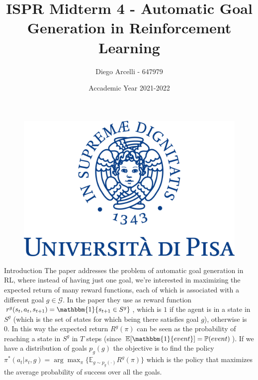 \documentclass{beamer}
\author[Diego Arcelli]{ Diego Arcelli - 647979}
\title[Automatic Goal Generation in RL]{ISPR Midterm 4 - Automatic Goal Generation in Reinforcement Learning}
\institute [University of Pisa] {University of Pisa}
\date{\scriptsize Accademic Year 2021-2022}
\begin{document}
	
	\begin{frame}
		\titlepage
		\begin{figure}[htpb]
			\begin{center}
				\includegraphics[width=0.3\linewidth]{images/unipi-logo.png}
			\end{center}
		\end{figure}
	\end{frame}
	

	
	\begin{frame}{Introduction}
		The paper addresses the problem of automatic goal generation in RL, where instead of having just one goal, we're interested in maximizing the expected return of many reward functions, each of which is associated with a different goal $g \in \mathcal{G}$. In the paper they use as reward function $r^g(s_t, a_t, s_{t+1}) = \mathbbm{1}\{s_{t+1} \in S^g\}$, which is $1$ if the agent is in a state in $S^g$ (which is the set of states for which being there satisfies goal $g$), otherwise is 0. In this way the expected return $R^g(\pi)$ can be seen as the probability of reaching a state in $S^g$ in $T$ steps (since $\mathbb{E}[\mathbbm{1}\{event\}] = \mathbb{P}(event)$). If we have a distribution of goals $p_g(g)$ the objective is to find the policy
		$ \pi^*(a_t|s_t, g) = \arg\max_{\pi} \{ \mathbb{E}_{g \sim p_g(\cdot)}R^g(\pi) \}$
		which is the policy that maximizes the average probability of success over all the goals.
	\end{frame}
\end{document}
